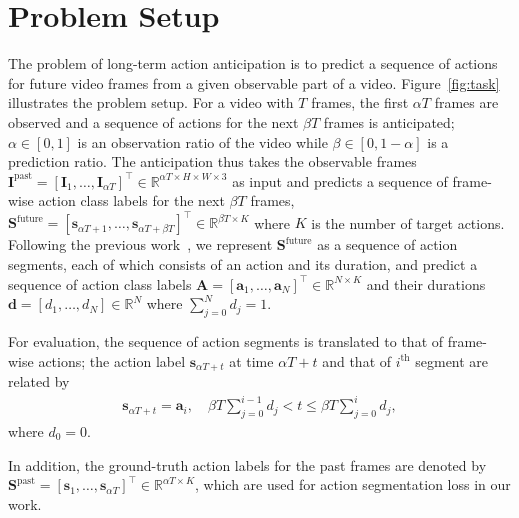 
\section{Problem Setup}
\label{sec:3}

The problem of long-term action anticipation is to predict a sequence of actions for future video frames from a given observable part of a video.
Figure~\ref{fig:task} illustrates the problem setup.
For a video with $T$ frames, the first $\alpha T$ frames are observed and a sequence of actions for the next $\beta T$ frames is anticipated; $\alpha \in [0,1]$ is an observation ratio of the video while $\beta \in [0, 1-\alpha]$ is a prediction ratio.
The anticipation thus takes the observable frames $\bm{I}^{\mathrm{past}} = [\bm{I}_1, \dots ,\bm{I}_{\alpha T}]^\top \in \mathbb{R}^{\alpha T \times H \times W \times 3}$ as input  
and predicts a sequence of frame-wise action class labels for the next $\beta T$ frames, $\bm{S}^{\mathrm{future}} = [\bm{s}_{\alpha T + 1}, \dots, \bm{s}_{\alpha T+\beta T}]^\top \in \mathbb{R}^{\beta T \times K}$ where $K$ is the number of target actions. 
Following the previous work~\cite{abu2018will, ke2019time, farha2020long, sener2020temporal, abu2019uncertainty}, we represent  $\bm{S}^{\mathrm{future}}$ as a sequence of action segments, each of which consists of an action and its duration, and 
predict a sequence of action class labels $\bm{A}=[\bm{a}_1, \dots, \bm{a}_N]^\top \in \mathbb{R}^{N \times K}$ and their durations $\bm{d}=[d_1, \dots, d_N] \in \mathbb{R}^{N}$ where $\sum^{N}_{j=0} d_j = 1$. 

For evaluation, the sequence of action segments is translated to that of frame-wise actions; the action label $\bm{s}_{\alpha T+t}$ at time $\alpha T+t$ and that of  $i^{\textrm{th}}$ segment are related by 
\vspace{-2mm}
\begin{align}
    \bm{s}_{\alpha T+t} = \bm{a}_i, \quad \beta T \sum^{i-1}_{j=0} d_j < t \leq \beta T \sum^{i}_{j=0} d_j,
    \label{eq:anticipation}
\end{align}
where $d_0=0$.

In addition, the ground-truth action labels for the past frames are denoted by $\bm{S}^{\mathrm{past}} = [\bm{s}_1, \dots ,\bm{s}_{\alpha T}]^\top \in \mathbb{R}^{\alpha T \times K}$, which are used for action segmentation loss in our work. 